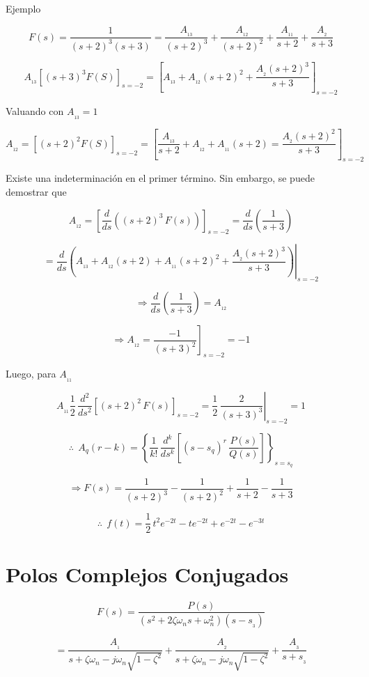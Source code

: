 Ejemplo

$$F(s) = \dfrac{1}{(s + 2)^3 (s + 3)} = \dfrac{A_{_{13}}}{(s + 2)^3} + \dfrac{A_{_{12}}}{(s + 2)^2} + \dfrac{A_{_{11}}}{s + 2} + \dfrac{A_{_2}}{s + 3}$$

$$A_{_{13}} \left[ (s + 3)^3 F(S) \right]_{s = -2} = \left[ A_{_{13}} + A_{_{12}}(s + 2)^2 + \dfrac{A_{_2} (s + 2)^3}{s + 3} \right]_{s = -2}$$

Valuando con $A_{_{13}} = 1$

$$A_{_{12}} = \left[ (s + 2)^2 F(S) \right]_{s = -2} = \left[ \dfrac{A_{_{13}}}{s + 2} + A_{_{12}} + A_{_{11}}(s + 2) =\dfrac{A_{_2}(s + 2)^2}{s + 3} \right]_{s = -2}$$

Existe una indeterminación en el primer término. Sin embargo, se puede demostrar que

$$A_{_{12}} = \left[ \dfrac{d}{ds}\left( (s + 2)^3\, F(s) \right) \right]_{s = -2}  = \dfrac{d}{ds}\left( \dfrac{1}{s + 3} \right) $$

$$= \left. \dfrac{d}{ds} \left( A_{_{13}} + A_{_{12}}(s + 2) + A_{_{11}}(s + 2)^2 + \dfrac{A_{_{2}}(s + 2)^3 }{s + 3}\right)  \right|_{s = -2} $$

$$\Rightarrow \dfrac{d}{ds} \left( \dfrac{1}{s + 3} \right) = A_{_{12}}$$

$$\Rightarrow A_{_{12}} = \left. \dfrac{-1}{(s + 3)^2} \right]_{s = -2} = - 1$$

Luego, para $A_{_{11}}$

$$A_{_{11}} \dfrac{1}{2}\,\dfrac{d^2}{ds^2} \left[ (s + 2)^2\,F(s) \right]_{s = -2} = \left.  \dfrac{1}{2}\, \dfrac{2}{(s + 3)^3} \right|_{s = -2} = 1$$

$$\therefore\:\: A_{q}(r - k) = \left\lbrace \dfrac{1}{k!}\,\dfrac{d^k}{ds^k} \left[ (s - s_{q})^r \, \dfrac{P(s)}{Q(s)} \right] \right\rbrace_{s = s_{q}}$$

$$\Rightarrow F(s) = \dfrac{1}{(s + 2)^3} - \dfrac{1}{(s + 2)^2} + \dfrac{1}{s + 2} - \dfrac{1}{s + 3}$$

$$\therefore \:\: f(t) = \dfrac{1}{2}\, t^2 e^{-2t} - te^{-2t} + e^{-2t} - e^{-3t}$$


\section{Polos Complejos Conjugados}

$$F(s) = \dfrac{P(s)}{(s^2 + 2\zeta \omega_{n}s + \omega_{n}^2)(s - s_{_{3}})}$$

$$= \dfrac{A_{_{1}}}{s + \zeta \omega_{n} - j\omega_{n} \sqrt{1 - \zeta^2}} + \dfrac{A_{_{2}}}{s + \zeta \omega_{n} - j\omega_{n} \sqrt{1 - \zeta^2}} + \dfrac{A_{_{3}}}{s + s_{_3}}$$

